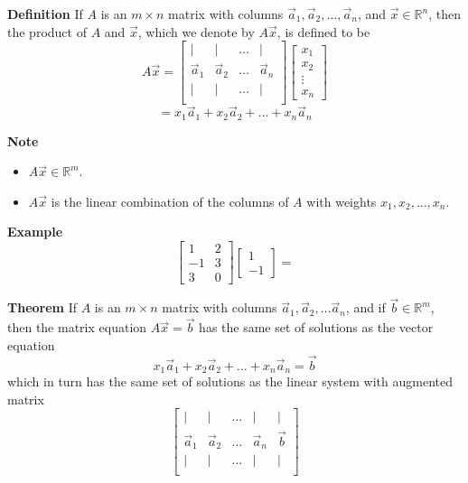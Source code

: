   \begin{frame}[fragile]
\textbf{Definition}
 If $A$ is an $m \times n$ matrix with columns 
 $\vec{a}_1, \vec{a}_2, \dots ,\vec{a}_n$,
and $\vec{x} \in \mathbb R^n$, then the product of $A$ and $\vec{x}$, 
which we denote by $A\vec{x}$, is defined to be 
\[ 
 A \vec{x} = 
 \left[\begin{array}{cccc}
  | & | & \dots & | \\
  \vec{a}_1 & \vec{a}_2 & \dots & \vec{a}_n  \\
  | & | & \dots & | \\
 \end{array}\right]
\left[\begin{array}{r} 
 x_1 \\ x_2 \\ \vdots \\ x_n
\end{array}\right]
\]
\[
 = x_1 \vec{a}_1 + x_2 \vec{a}_2 + \dots + x_n \vec{a}_n
\]


\textbf{Note}
\begin{itemize}
\item $A\vec{x} \in \mathbb R^m$.
\item $A\vec{x}$ is the linear combination of the columns of $A$ with weights $x_1, x_2, \dots, x_n$.
\end{itemize}

\end{frame}

  \begin{frame}[fragile]
\textbf{Example}
\[
 \left[\begin{array}{rr}
  1 & 2 \\
  -1 & 3 \\
  3 & 0 
 \end{array}\right]
\left[\begin{array}{r}
 1 \\ -1
\end{array}\right]
=
\]

\end{frame}

  \begin{frame}[fragile]
\textbf{Theorem}
 If $A$ is an $m \times n$ matrix with columns 
 $\vec{a}_1, \vec{a}_2, \dots \vec{a}_n$, 
 and if $\vec{b}\in \mathbb R^m$, then the matrix equation 
 $A \vec{x} =\vec{b}$ has the same set of solutions 
 as the vector equation
 \[
  x_1\vec{a}_1 + x_2 \vec{a}_2 + \dots + x_n \vec{a}_n = \vec{b}
 \]
which in turn has the same set of solutions as the linear
system with augmented matrix 
\[
 \left[\begin{array}{ccccc}
  | & | & \dots & | & |  \\
  \vec{a}_1 & \vec{a}_2 & \dots & \vec{a}_n & \vec{b} \\
  | & | & \dots & | &| \\
 \end{array}\right]
\]


%
\end{frame}

